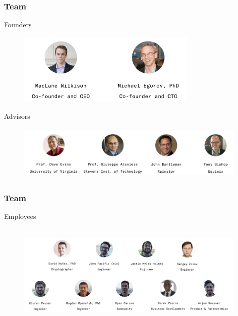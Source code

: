 \documentclass[xetex,mathsans,sans,aspectratio=169]{beamer}
\begin{document}
    \begin{frame}
      \frametitle{Team}
        Founders
        \begin{figure}
            \centering
            \includegraphics[height=3.5cm]{pdf/founders.pdf}
        \end{figure}

        Advisors
        \begin{figure}
            \centering
            \includegraphics[height=2.7cm]{pdf/advisors.pdf}
        \end{figure}
    \end{frame}

    \begin{frame}
      \frametitle{Team}
      Employees
      \begin{figure}
        \centering
        \includegraphics[height=5cm]{pdf/employees.pdf}
      \end{figure}
    \end{frame}
\end{document}
